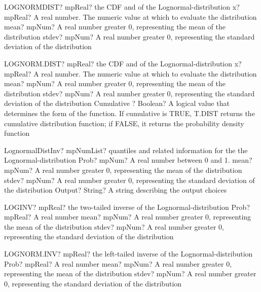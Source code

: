 \documentclass[12pt,a4paper,openany]{book}
\begin{document}
\begin{mpFunctionsExtract}
\mpWorksheetFunctionThreeNotImplemented
{LOGNORMDIST? mpReal? the CDF and of the Lognormal-distribution}
{x? mpReal? A real number. The numeric value at which to evaluate the distribution}
{mean? mpNum? A real number greater 0, representing the mean of the distribution}
{stdev? mpNum? A real number greater 0, representing the standard deviation of the distribution}
\end{mpFunctionsExtract}

\begin{mpFunctionsExtract}
\mpWorksheetFunctionFourNotImplemented
{LOGNORM.DIST? mpReal? the CDF and of the Lognormal-distribution}
{x? mpReal? A real number. The numeric value at which to evaluate the distribution}
{mean? mpNum? A real number greater 0, representing the mean of the distribution}
{stdev? mpNum? A real number greater 0, representing the standard deviation of the distribution}
{Cumulative ? Boolean? A logical value that determines the form of the function. If cumulative is TRUE, T.DIST returns the cumulative distribution function; if FALSE, it returns the probability density function}
\end{mpFunctionsExtract}

\begin{mpFunctionsExtract}
\mpFunctionFourNotImplemented
{LognormalDistInv? mpNumList? quantiles and related information for the the Lognormal-distribution}
{Prob? mpNum? A real number between 0 and 1.}
{mean? mpNum? A real number greater 0, representing the mean of the distribution}
{stdev? mpNum? A real number greater 0, representing the standard deviation of the distribution}
{Output? String? A string describing the output choices}
\end{mpFunctionsExtract}

\begin{mpFunctionsExtract}
\mpWorksheetFunctionThreeNotImplemented
{LOGINV? mpReal? the two-tailed inverse of the Lognormal-distribution}
{Prob? mpReal? A real number}
{mean? mpNum? A real number greater 0, representing the mean of the distribution}
{stdev? mpNum? A real number greater 0, representing the standard deviation of the distribution}
\end{mpFunctionsExtract}

\begin{mpFunctionsExtract}
\mpWorksheetFunctionThreeNotImplemented
{LOGNORM.INV? mpReal? the left-tailed inverse of the Lognormal-distribution}
{Prob? mpReal? A real number}
{mean? mpNum? A real number greater 0, representing the mean of the distribution}
{stdev? mpNum? A real number greater 0, representing the standard deviation of the distribution}
\end{mpFunctionsExtract}
\end{document}
